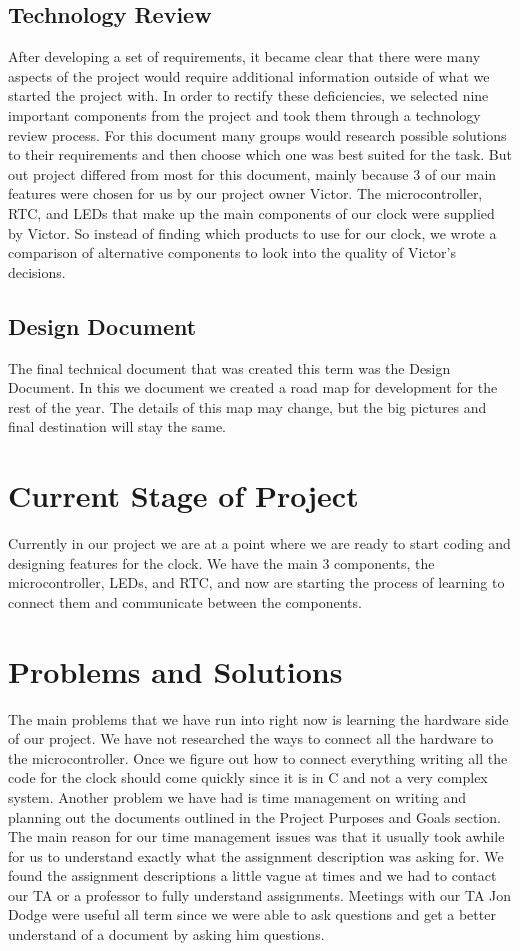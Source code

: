 \documentclass[10pt,draftclsnofoot,onecolumn]{IEEEtran}
\begin{document}
\subsection{Technology Review}
After developing a set of requirements, it became clear that there were many aspects of the project would require additional information outside of what we started the project with.
In order to rectify these deficiencies, we selected nine important components from the project and took them through a technology review process.
For this document many groups would research possible solutions to their requirements and then choose which one was best suited for the task. 
But out project differed from most for this document, mainly because 3 of our main features were chosen for us by our project owner Victor.
The microcontroller, RTC, and LEDs that make up the main components of our clock were supplied by Victor.
So instead of finding which products to use for our clock, we wrote a comparison of alternative components to look into the quality of Victor's decisions. 
\subsection{Design Document}
The final technical document that was created this term was the Design Document.
In this we document we created a road map for development for the rest of the year. 
The details of this map may change, but the big pictures and final destination will stay the same.

\section{Current Stage of Project}
Currently in our project we are at a point where we are ready to start coding and designing features for the clock.
We have the main 3 components, the microcontroller, LEDs, and RTC, and now are starting the process of learning to connect them and communicate between the components.

\section{Problems and Solutions}
The main problems that we have run into right now is learning the hardware side of our project.
We have not researched the ways to connect all the hardware to the microcontroller.
Once we figure out how to connect everything writing all the code for the clock should come quickly since it is in C and not a very complex system.
Another problem we have had is time management on writing and planning out the documents outlined in the Project Purposes and Goals section. 
The main reason for our time management issues was that it usually took awhile for us to understand exactly what the assignment description was asking for.
We found the assignment descriptions a little vague at times and we had to contact our TA or a professor to fully understand assignments.
Meetings with our TA Jon Dodge were useful all term since we were able to ask questions and get a better understand of a document by asking him questions.
\end{document}
